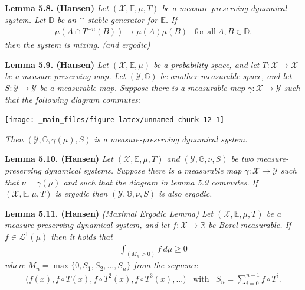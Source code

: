 \documentclass[
]{book}
\begin{document}
\textbf{Lemma 5.8. (Hansen)} \emph{Let \((\mathcal{X},\mathbb{E},\mu,T)\) be a measure-preserving dynamical system. Let \(\mathbb{D}\) be an \(\cap\)-stable generator for \(\mathbb{E}\). If}
\begin{align*}
        \mu(A\cap T^{-n}(B))\to \mu(A)\mu(B)\hspace{10pt}\text{for all}\ A,B\in\mathbb{D}.\tag{5.10}
\end{align*}
\emph{then the system is mixing. (and ergodic)}

\textbf{Lemma 5.9. (Hansen)} \emph{Let \((\mathcal{X},\mathbb{E},\mu)\) be a probability space, and let \(T : \mathcal{X}\to \mathcal{X}\) be a measure-preserving map. Let \((\mathcal{Y},\mathbb{G})\) be another measurable space, and let \(S : \mathcal{Y} \to \mathcal{Y}\) be a measurable map.}
\emph{Suppose there is a measurable map \(\gamma : \mathcal{X}\to \mathcal{Y}\) such that the following diagram commutes:}

\begin{center}\texttt{[image: \_main\_files/figure-latex/unnamed-chunk-12-1]} \end{center}

\emph{Then \((\mathcal{Y},\mathbb{G},\gamma(\mu),S)\) is a measure-preserving dynamical system.}

\textbf{Lemma 5.10. (Hansen)} \emph{Let \((\mathcal{X},\mathbb{E},\mu,T)\) and \((\mathcal{Y},\mathbb{G},\nu,S)\) be two measure-preserving dynamical systems. Suppose there is a measurable map \(\gamma : \mathcal{X}\to\mathcal{Y}\) such that \(\nu =\gamma(\mu)\) and such that the diagram in lemma 5.9 commutes.}
\emph{If \((\mathcal{X},\mathbb{E},\mu,T)\) is ergodic then \((\mathcal{Y},\mathbb{G},\nu,S)\) is also ergodic.}

\textbf{Lemma 5.11. (Hansen)} \emph{(Maximal Ergodic Lemma) Let \((\mathcal{X},\mathbb{E},\mu,T)\) be a measure-preserving dynamical system, and let \(f : \mathcal{X}\to \mathbb{R}\) be Borel measurable. If \(f\in \mathcal{L}^1(\mu)\) then it holds that}
\begin{align*}
    \int_{(M_n>0)}f\ d\mu\ge 0\tag{5.14}
\end{align*}
\emph{where \(M_n=\max\{0,S_1,S_2,...,S_n\}\) from the sequence}
\begin{align*}
    \Big(f(x), f\circ T(x),f\circ T^2(x),f\circ T^3(x),...\Big)\hspace{10pt}\text{with}\hspace{10pt}S_n=\sum_{i=0}^{n-1}f\circ T^i.
\end{align*}
\end{document}
